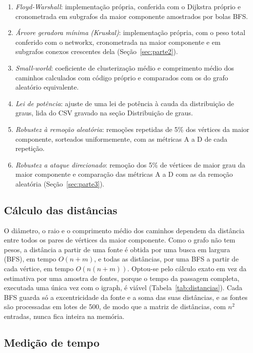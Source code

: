 \begin{enumerate}
  \item \emph{Floyd-Warshall}: implementação própria, conferida com o Dijkstra próprio e cronometrada em subgrafos da maior componente amostrados por bolas BFS.
  \item \emph{Árvore geradora mínima (Kruskal)}: implementação própria, com o peso total conferido com o networkx, cronometrada na maior componente e em subgrafos conexos crescentes dela (Seção~\ref{sec:parte2}).
  \item \emph{Small-world}: coeficiente de clusterização médio e comprimento médio dos caminhos calculados com código próprio e comparados com os do grafo aleatório equivalente.
  \item \emph{Lei de potência}: ajuste de uma lei de potência à cauda da distribuição de graus, lida do CSV gravado na seção Distribuição de graus.
  \item \emph{Robustez à remoção aleatória}: remoções repetidas de 5\% dos vértices da maior componente, sorteados uniformemente, com as métricas A a D de cada repetição.
  \item \emph{Robustez a ataque direcionado}: remoção dos 5\% de vértices de maior grau da maior componente e comparação das métricas A a D com as da remoção aleatória (Seção~\ref{sec:parte3}).
\end{enumerate}

\subsection{Cálculo das distâncias}

O diâmetro, o raio e o comprimento médio dos caminhos dependem da distância entre todos os pares de vértices da maior componente. Como o grafo não tem pesos, a distância a partir de uma fonte é obtida por uma busca em largura (BFS), em tempo $O(n + m)$, e todas as distâncias, por uma BFS a partir de cada vértice, em tempo $O(n(n + m))$. Optou-se pelo cálculo exato em vez da estimativa por uma amostra de fontes, porque o tempo da passagem completa, executada uma única vez com o igraph, é viável (Tabela~\ref{tab:distancias}). Cada BFS guarda só a excentricidade da fonte e a soma das suas distâncias, e as fontes são processadas em lotes de 500, de modo que a matriz de distâncias, com $n^2$ entradas, nunca fica inteira na memória.

\subsection{Medição de tempo}

